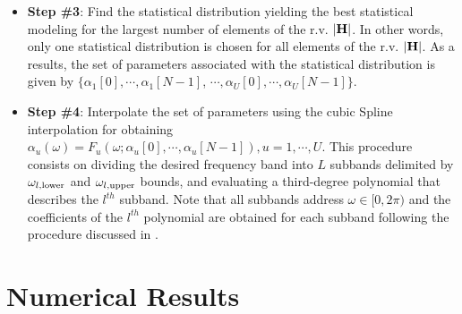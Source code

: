 \documentclass[journal]{IEEEtran}
\begin{document}
\begin{itemize}
	\item \textbf{Step \#3}: Find the statistical distribution yielding the best statistical modeling for the largest number of elements of the \ac{r.v.} $\bf |H|$. %
	In other words, only one statistical distribution is chosen for all elements of the \ac{r.v.} $\bf |H|$. As a results, the set of parameters associated with the statistical distribution is given by $\{\alpha_{1}[0], \cdots, \alpha_{1}[N-1]$,   $\cdots, \alpha_{U}[0], \cdots, \alpha_{U}[N-1]\}$.

    \item \textbf{Step \#4}: Interpolate the set of parameters using the cubic Spline interpolation for obtaining $\alpha_u (\omega) = F_u(\omega; \alpha_{u}[0], \cdots, \alpha_{u}[N-1]), u=1,\cdots,U$. This procedure consists on dividing the desired frequency band into $L$ subbands delimited by $\omega_{l,\textnormal{lower}}$ and $\omega_{l,\textnormal{upper}}$ bounds, and evaluating a third-degree polynomial that describes the $l^{th}$ subband. Note that all subbands address $\omega \in [0,2\pi)$ and the coefficients of the $l^{th}$ polynomial are obtained for each subband following the procedure discussed in \cite{ENA,CS1}.      
\end{itemize}


\section{Numerical Results}
\end{document}
